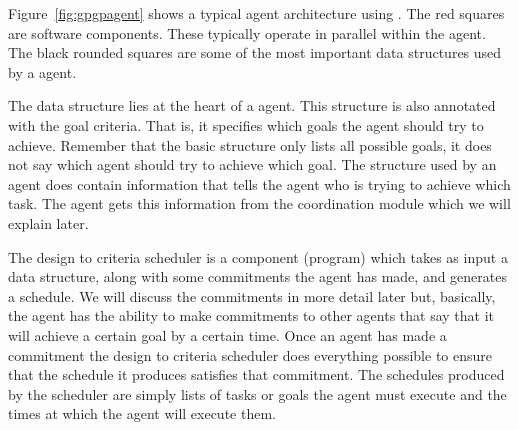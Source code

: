 \begin{SCfigure}
\begin{minipage}{1.0\linewidth}
\begin{center}
    \end{center}
  \end{minipage}
  \caption{ agent architecture. Components are in squares and data
    structures are in rounded squares.}
  \label{fig:gpgpagent}
\end{SCfigure}


Figure~\ref{fig:gpgpagent} shows a typical agent architecture using
. The red squares are software components. These typically operate
in parallel within the agent. The black rounded squares are some of
the most important data structures used by a  agent.

The \taems{} data structure lies at the heart of a  agent. This
\taems{} structure is also annotated with the goal criteria. That is,
it specifies which goals the agent should try to achieve. Remember
that the basic \taems{} structure only lists all possible goals, it
does not say which agent should try to achieve which goal. The \taems{}
structure used by an agent does contain information that tells the
agent who is trying to achieve which task. The agent gets this
information from the  coordination module which we will explain
later.

The design to criteria scheduler is a component (program) which takes
as input a \taems{} data structure, along with some commitments the
agent has made, and generates a schedule. We will discuss the
commitments in more detail later but, basically, the agent has the
ability to make commitments to other agents that say that it will
achieve a certain goal by a certain time. Once an agent has made a
commitment the design to criteria scheduler does everything possible
to ensure that the schedule it produces satisfies that commitment.
The schedules produced by the scheduler are simply lists of tasks or
goals the agent must execute and the times at which the agent will
execute them.

